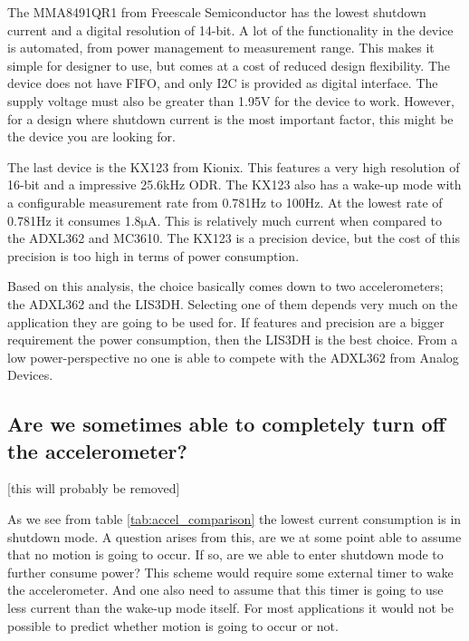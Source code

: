The MMA8491QR1 from Freescale Semiconductor has the lowest shutdown current and a digital resolution of 14-bit. A lot of the functionality in the device is automated, from power management to measurement range. This makes it simple for designer to use, but comes at a cost of reduced design flexibility. The device does not have FIFO, and only I2C is provided as digital interface. The supply voltage must also be greater than 1.95V for the device to work. However, for a design where shutdown current is the most important factor, this might be the device you are looking for.

The last device is the KX123 from Kionix. This features a very high resolution of 16-bit and a impressive 25.6kHz ODR. The KX123 also has a wake-up mode with a configurable measurement rate from 0.781Hz to 100Hz. At the lowest rate of 0.781Hz it consumes 1.8$\si{\micro\ampere}$. This is relatively much current when compared to the ADXL362 and MC3610. The KX123 is a precision device, but the cost of this precision is too high in terms of power consumption.

Based on this analysis, the choice basically comes down to two accelerometers; the ADXL362 and the LIS3DH. Selecting one of them depends very much on the application they are going to be used for. If features and precision are a bigger requirement the power consumption, then the LIS3DH is the best choice. From a low power-perspective no one is able to compete with the ADXL362 from Analog Devices.

\subsection{Are we sometimes able to completely turn off the accelerometer?}

[this will probably be removed]

As we see from table \ref{tab:accel_comparison} the lowest current consumption is in shutdown mode. A question arises from this, are we at some point able to assume that no motion is going to occur. If so, are we able to enter shutdown mode to further consume power? This scheme would require some external timer to wake the accelerometer. And one also need to assume that this timer is going to use less current than the wake-up mode itself. For most applications it would not be possible to predict whether motion is going to occur or not.